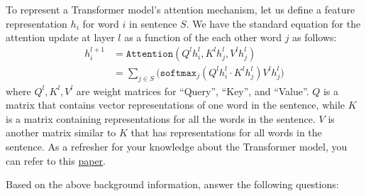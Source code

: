 To represent a Transformer model's attention mechanism, let us define a feature representation $h_i$ for word $i$ in sentence $S$. We have the standard equation for the attention update at layer $l$ as a function of the each other word $j$ as follows:
\begin{align}
    h_{i}^{l+1} &= \texttt{Attention}(Q^{l}h^{l}_{i}, K^{l}h^{l}_{j}, V^{l}h^{l}_{j}) \label{eq: Attention1}\\
     &= \sum_{j\in S} \big( \texttt{softmax}_{j} (Q^{l}h^{l}_{i} \cdot K^{l}h^{l}_{j}) V^{l} h^{l}_{j} \big) \label{eq: Attention2}
\end{align}
where $Q^{l}, K^{l}, V^{l}$ are weight matrices for ``Query'', ``Key'', and ``Value''. $Q$ is a matrix that contains vector representations of one word in the sentence, while $K$ is a matrix containing representations for all the words in the sentence. $V$ is another matrix similar to $K$ that has representations for all words in the sentence. As a refresher for your knowledge about the Transformer model, you can refer to this \href{https://arxiv.org/abs/1706.03762}{paper}.


Based on the above background information, answer the following questions:

